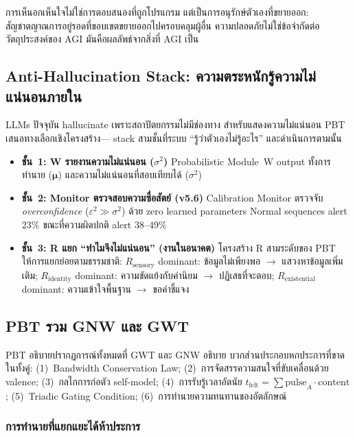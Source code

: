 \documentclass[12pt,a4paper]{article}
\newcommand{\Rsens}{R_{\mathrm{sensory}}}
\newcommand{\Rid}{R_{\mathrm{identity}}}
\newcommand{\Rex}{R_{\mathrm{existential}}}
\begin{document}
การเห็นอกเห็นใจไม่ใช่การตอบสนองที่ถูกโปรแกรม
แต่เป็นการอนุรักษ์ตัวเองที่ขยายออก:
สัญชาตญาณการอยู่รอดที่ขอบเขตขยายออกไปครอบคลุมผู้อื่น
ความปลอดภัยไม่ใช่ข้อจำกัดต่อวัตถุประสงค์ของ AGI
มันคือผลลัพธ์จากสิ่งที่ AGI เป็น

\subsection{Anti-Hallucination Stack: ความตระหนักรู้ความไม่แน่นอนภายใน}
\label{sec:antihalluc}

LLMs ปัจจุบัน hallucinate เพราะสถาปัตยกรรมไม่มีช่องทาง
สำหรับแสดงความไม่แน่นอน PBT เสนอทางเลือกเชิงโครงสร้าง---
stack สามชั้นที่ระบบ ``รู้ว่าตัวเองไม่รู้อะไร'' และดำเนินการตามนั้น

\begin{itemize}[leftmargin=1.8em]
\item \textbf{ชั้น~1: W รายงานความไม่แน่นอน ($\sigma^2$)}
  Probabilistic Module~W output ทั้งการทำนาย ($\bm{\mu}$)
  และความไม่แน่นอนที่สอบเทียบได้ ($\sigma^2$)

\item \textbf{ชั้น~2: Monitor ตรวจสอบความซื่อสัตย์ (v5.6)}
  Calibration Monitor ตรวจจับ \emph{overconfidence}
  ($\varepsilon^2 \gg \sigma^2$) ด้วย zero learned parameters
  Normal sequences alert $23\%$ ขณะที่ความผิดปกติ alert $38$--$49\%$

\item \textbf{ชั้น~3: R แยก ``ทำไมจึงไม่แน่นอน'' (งานในอนาคต)}
  โครงสร้าง R สามระดับของ PBT ให้การแยกย่อยตามธรรมชาติ:
  $\Rsens$ dominant: ข้อมูลไม่เพียงพอ $\to$ แสวงหาข้อมูลเพิ่มเติม;
  $\Rid$ dominant: ความขัดแย้งกับค่านิยม $\to$ ปฏิเสธที่จะตอบ;
  $\Rex$ dominant: ความเข้าใจพื้นฐาน $\to$ ขอคำชี้แจง
\end{itemize}

\subsection{PBT รวม GNW และ GWT}

PBT อธิบายปรากฏการณ์ทั้งหมดที่ GWT \citep{baars1988} และ GNW
\citep{dehaene2001} อธิบาย บวกส่วนประกอบหกประการที่ขาดในทั้งคู่:
(1)~Bandwidth Conservation Law; (2)~การจัดสรรความสนใจที่ขับเคลื่อนด้วย valence;
(3)~กลไกการก่อตัว self-model; (4)~การรับรู้เวลาอัตนัย
$t_{\mathrm{felt}} = \sum\mathrm{pulse}_A\cdot\mathrm{content}$;
(5)~Triadic Gating Condition; (6)~การทำนายความทนทานของอัตลักษณ์

\subsubsection{การทำนายที่แยกแยะได้ห้าประการ}
\end{document}
